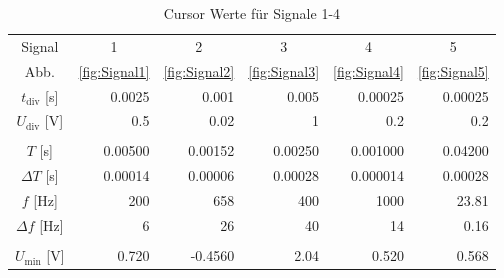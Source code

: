 \setcellgapes{3pt}
\begin{table}[htbp]
    \centering\makegapedcells
    \caption{Cursor Werte für Signale 1-4}
\begin{tabular}{crrrrr}
\hline
\multicolumn{1}{|c}{Signal}         & \multicolumn{1}{c}{1} & \multicolumn{1}{c}{2} & \multicolumn{1}{c}{3} & \multicolumn{1}{c}{4}  & \multicolumn{1}{c|}{5}      \\
\multicolumn{1}{|c}{Abb.}           & \multicolumn{1}{c}{\ref{fig:Signal1}}  & \multicolumn{1}{c}{\ref{fig:Signal2}}  & \multicolumn{1}{c}{\ref{fig:Signal3}}  & \multicolumn{1}{c}{\ref{fig:Signal4}}  &\multicolumn{1}{c|}{\ref{fig:Signal5}}       \\ \hline\hline
\multicolumn{1}{|c|}{$t_\text{div}$ [\unit{\s}]}          & 0.0025                & 0.001                 & 0.005                 & 0.00025 & \multicolumn{1}{r|}{0.00025}  \\ \hline
\multicolumn{1}{|c|}{$U_\text{div}$ [\unit{\volt}]}          & 0.5                   & 0.02                  & 1                     & 0.2 &\multicolumn{1}{r|}{0.2}      \\ \hline
                                    &                       &                       &                       &                               \\ \hline
\multicolumn{1}{|c|}{$T$ [\unit{\s}]}             & 0.00500               & 0.00152               & 0.00250               & 0.001000 & \multicolumn{1}{r|}{0.04200} \\ \hline
\multicolumn{1}{|c|}{$\Delta T$ [\unit{\s}]}       & 0.00014               & 0.00006               & 0.00028               & 0.000014 & \multicolumn{1}{r|}{0.00028} \\ \hline
\multicolumn{1}{|c|}{$f$ [\unit{\hertz}]}             & 200                   & 658                   & 400                   & 1000 & \multicolumn{1}{r|}{23.81}     \\ \hline
\multicolumn{1}{|c|}{$\Delta f$ [\unit{\hertz}]}       & 6                     & 26                    & 40                    & 14 & \multicolumn{1}{r|}{0.16}       \\ \hline
                                    &                       &                       &                       &                               \\ \hline
\multicolumn{1}{|c|}{$U_\text{min}$ [\unit{\volt}]}        & 0.720                 & -0.4560               & 2.04                  & 0.520 & \multicolumn{1}{r|}{0.568}    \\ \hline

\end{tabular}
\end{table}
